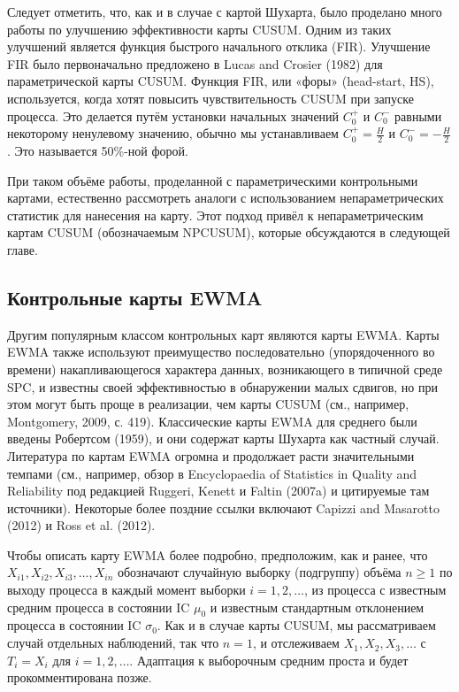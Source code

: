 Следует отметить, что, как и в случае с картой Шухарта, было проделано много работы по улучшению эффективности карты CUSUM. Одним из таких улучшений является функция быстрого начального отклика (FIR). Улучшение FIR было первоначально предложено в Lucas and Crosier (1982) для параметрической карты CUSUM. Функция FIR, или «форы» (head-start, HS), используется, когда хотят повысить чувствительность CUSUM при запуске процесса. Это делается путём установки начальных значений \(C_0^+\) и \(C_0^-\) равными некоторому ненулевому значению, обычно мы устанавливаем \(C_0^+ = \frac{H}{2}\) и \(C_0^- = -\frac{H}{2}\). Это называется 50\%-ной форой.

При таком объёме работы, проделанной с параметрическими контрольными картами, естественно рассмотреть аналоги с использованием непараметрических статистик для нанесения на карту. Этот подход привёл к непараметрическим картам CUSUM (обозначаемым NPCUSUM), которые обсуждаются в следующей главе.

\subsection{Контрольные карты EWMA}
Другим популярным классом контрольных карт являются карты EWMA. Карты EWMA также используют преимущество последовательно (упорядоченного во времени) накапливающегося характера данных, возникающего в типичной среде SPC, и известны своей эффективностью в обнаружении малых сдвигов, но при этом могут быть проще в реализации, чем карты CUSUM (см., например, Montgomery, 2009, с. 419). Классические карты EWMA для среднего были введены Робертсом (1959), и они содержат карты Шухарта как частный случай. Литература по картам EWMA огромна и продолжает расти значительными темпами (см., например, обзор в Encyclopaedia of Statistics in Quality and Reliability под редакцией Ruggeri, Kenett и Faltin (2007a) и цитируемые там источники). Некоторые более поздние ссылки включают Capizzi and Masarotto (2012) и Ross et al. (2012).

Чтобы описать карту EWMA более подробно, предположим, как и ранее, что \(X_{i1}, X_{i2}, X_{i3}, \ldots, X_{in}\) обозначают случайную выборку (подгруппу) объёма \(n \geq 1\) по выходу процесса в каждый момент выборки \(i = 1, 2, \ldots\), из процесса с известным средним процесса в состоянии IC \(\mu_0\) и известным стандартным отклонением процесса в состоянии IC \(\sigma_0\). Как и в случае карты CUSUM, мы рассматриваем случай отдельных наблюдений, так что \(n = 1\), и отслеживаем \(X_1, X_2, X_3, \ldots\) с \(T_i = X_i\) для \(i = 1, 2, \ldots\). Адаптация к выборочным средним проста и будет прокомментирована позже.

